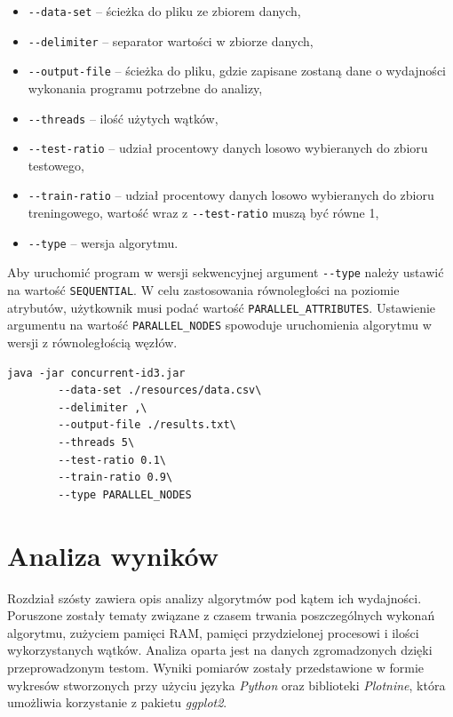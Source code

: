 \documentclass[12pt]{article}
\begin{document}
{\renewcommand\labelitemi{}
\begin{itemize}
    \item \verb|--data-set| -- ścieżka do pliku ze zbiorem danych,
    \item \verb|--delimiter| -- separator wartości w zbiorze danych,
    \item \verb|--output-file| -- ścieżka do pliku, gdzie zapisane zostaną dane o wydajności wykonania programu potrzebne do analizy,
    \item \verb|--threads| -- ilość użytych wątków,
    \item \verb|--test-ratio| -- udział procentowy danych losowo wybieranych do zbioru testowego,
    \item \verb|--train-ratio| -- udział procentowy danych losowo wybieranych do zbioru treningowego, wartość wraz z \verb|--test-ratio| muszą być równe 1,
    \item \verb|--type| -- wersja algorytmu.
\end{itemize}}

Aby uruchomić program w wersji sekwencyjnej argument \verb|--type| należy ustawić na wartość \verb|SEQUENTIAL|.
W celu zastosowania równoległości na poziomie atrybutów, użytkownik musi podać wartość \verb|PARALLEL_ATTRIBUTES|.
Ustawienie argumentu na wartość \verb|PARALLEL_NODES| spowoduje uruchomienia algorytmu w wersji z równoległością węzłów.

\begin{lstlisting}[caption=Przykładowe uruchomienie programu,frame=single]
    java -jar concurrent-id3.jar
        --data-set ./resources/data.csv\
        --delimiter ,\
        --output-file ./results.txt\
        --threads 5\
        --test-ratio 0.1\
        --train-ratio 0.9\
        --type PARALLEL_NODES
\end{lstlisting}

\newpage
\section{Analiza wyników}

Rozdział szósty zawiera opis analizy algorytmów pod kątem ich wydajności. Poruszone zostały
tematy związane z czasem trwania poszczególnych wykonań algorytmu, zużyciem pamięci RAM, pamięci
przydzielonej procesowi i ilości wykorzystanych wątków. Analiza oparta jest na danych zgromadzonych
dzięki przeprowadzonym testom. Wyniki pomiarów zostały przedstawione w formie
wykresów stworzonych przy użyciu języka \textit{Python} oraz biblioteki \textit{Plotnine}, która umożliwia
korzystanie z pakietu \textit{ggplot2}.
\end{document}
